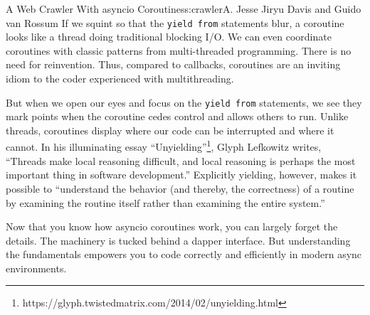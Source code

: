 \begin{aosachapter}{A Web Crawler With asyncio Coroutines}{s:crawler}{A. Jesse Jiryu Davis and Guido van Rossum}
If we squint so that the \texttt{yield from} statements blur, a
coroutine looks like a thread doing traditional blocking I/O. We can
even coordinate coroutines with classic patterns from multi-threaded
programming. There is no need for reinvention. Thus, compared to
callbacks, coroutines are an inviting idiom to the coder experienced
with multithreading.

But when we open our eyes and focus on the \texttt{yield from}
statements, we see they mark points when the coroutine cedes control and
allows others to run. Unlike threads, coroutines display where our code
can be interrupted and where it cannot. In his illuminating essay
``Unyielding''\footnote{https://glyph.twistedmatrix.com/2014/02/unyielding.html},
Glyph Lefkowitz writes, ``Threads make local reasoning difficult, and
local reasoning is perhaps the most important thing in software
development.'' Explicitly yielding, however, makes it possible to
``understand the behavior (and thereby, the correctness) of a routine by
examining the routine itself rather than examining the entire system.''

Now that you know how asyncio coroutines work, you can largely forget
the details. The machinery is tucked behind a dapper interface. But
understanding the fundamentals empowers you to code correctly and
efficiently in modern async environments.

\end{aosachapter}

